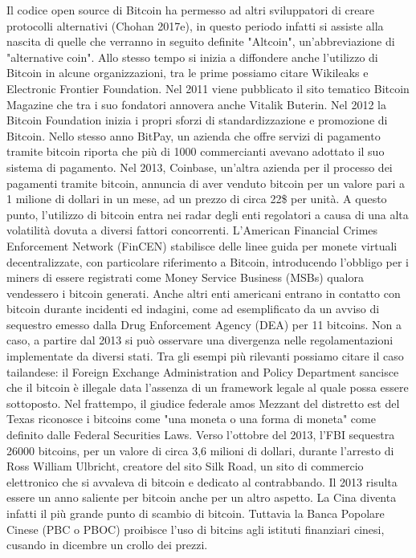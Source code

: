Il codice open source di Bitcoin ha permesso ad altri sviluppatori di creare protocolli alternativi (Chohan 2017e), in questo periodo infatti si assiste alla nascita di quelle che verranno in seguito definite "Altcoin", un'abbreviazione di "alternative coin". Allo stesso tempo si inizia a diffondere anche l'utilizzo di Bitcoin in alcune organizzazioni, tra le prime possiamo citare Wikileaks e Electronic Frontier Foundation. Nel 2011 viene pubblicato il sito tematico Bitcoin Magazine che tra i suo fondatori annovera anche Vitalik Buterin. Nel 2012 la Bitcoin Foundation inizia i propri sforzi di standardizzazione e promozione di Bitcoin. Nello stesso anno BitPay, un azienda che offre servizi di pagamento tramite bitcoin riporta che più di 1000 commercianti avevano adottato il suo sistema di pagamento. Nel 2013, Coinbase, un'altra azienda per il processo dei pagamenti tramite bitcoin, annuncia di aver venduto bitcoin per un valore pari a 1 milione di dollari in un mese, ad un prezzo di circa 22\$ per unità. 
A questo punto, l'utilizzo di bitcoin entra nei radar degli enti regolatori a causa di una alta volatilità dovuta a diversi fattori concorrenti. L'American Financial Crimes Enforcement Network (FinCEN) stabilisce delle linee guida per monete virtuali decentralizzate, con particolare riferimento a Bitcoin, introducendo l'obbligo per i miners di essere registrati come Money Service Business (MSBs) qualora vendessero i bitcoin generati. Anche altri enti americani entrano in contatto con bitcoin durante incidenti ed indagini, come ad esemplificato da un avviso di sequestro emesso dalla Drug Enforcement Agency (DEA) per 11 bitcoins. Non a caso, a partire dal 2013 si può osservare una divergenza nelle regolamentazioni implementate da diversi stati. 
Tra gli esempi più rilevanti possiamo citare il caso tailandese: il Foreign Exchange Administration and Policy Department sancisce che il bitcoin è illegale data l'assenza di un framework legale al quale possa essere sottoposto. Nel frattempo, il giudice federale amos Mezzant del distretto est del Texas riconosce i bitcoins come "una moneta o una forma di moneta" come definito dalle Federal Securities Laws. Verso l'ottobre del 2013, l'FBI sequestra 26000 bitcoins, per un valore di circa 3,6 milioni di dollari, durante l'arresto di Ross William Ulbricht, creatore del sito Silk Road, un sito di commercio elettronico che si avvaleva di bitcoin e dedicato al contrabbando. Il 2013 risulta essere un anno saliente per bitcoin anche per un altro aspetto. La Cina diventa infatti il più grande punto di scambio di bitcoin. Tuttavia la Banca Popolare Cinese (PBC o PBOC) proibisce l'uso di bitcins agli istituti finanziari cinesi, cusando in dicembre un crollo dei prezzi. 

